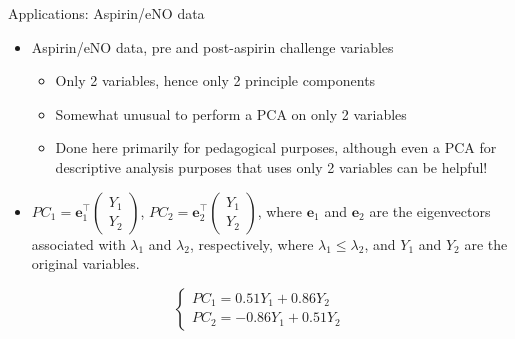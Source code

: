 \documentclass[
  9pt,
  ignorenonframetext,
]{beamer}
\begin{document}
\begin{frame}{Applications: Aspirin/eNO data}
\protect\hypertarget{applications-aspirineno-data}{}
\begin{itemize}
\item
  Aspirin/eNO data, pre and post-aspirin challenge variables

  \begin{itemize}
  \item
    Only 2 variables, hence only 2 principle components
  \item
    Somewhat unusual to perform a PCA on only 2 variables
  \item
    Done here primarily for pedagogical purposes, although even a PCA
    for descriptive analysis purposes that uses only 2 variables can be
    helpful!
  \end{itemize}
\item
  \(PC_1 = \pmb e_1^{\top} \begin{pmatrix} Y_1\\ Y_2 \end{pmatrix}\),
  \(PC_2 = \pmb e_2^{\top} \begin{pmatrix} Y_1\\ Y_2 \end{pmatrix}\),
  where \(\pmb e_1\) and \(\pmb e_2\) are the eigenvectors associated
  with \(\lambda_1\) and \(\lambda_2\), respectively, where
  \(\lambda_1 \leq \lambda_2\), and \(Y_1\) and \(Y_2\) are the original
  variables.
\end{itemize}

\[
\begin{cases}
PC_1 = 0.51 Y_1 + 0.86 Y_2 \\
PC_2 = -0.86 Y_1 + 0.51 Y_2
\end{cases}
\]
\end{frame}
\end{document}
